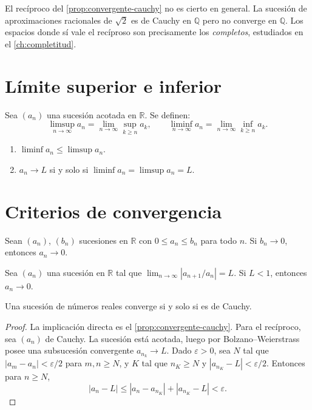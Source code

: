 El recíproco del \cref{prop:convergente-cauchy} no es cierto en general. La sucesión de aproximaciones racionales de $\sqrt{2}$ es de Cauchy en $\mathbb{Q}$ pero no converge en $\mathbb{Q}$. Los espacios donde sí vale el recíproso son precisamente los \emph{completos}, estudiados en el \cref{ch:completitud}.

\section{Límite superior e inferior}

\begin{definition}
\label{def:limsup-liminf}
Sea $(a_n)$ una sucesión acotada en $\mathbb{R}$. Se definen:
\[
  \limsup_{n\to\infty} a_n=\lim_{n\to\infty}\sup_{k\geq n}a_k,\qquad
  \liminf_{n\to\infty} a_n=\lim_{n\to\infty}\inf_{k\geq n}a_k.
\]
\end{definition}

\begin{proposition}
\label{prop:limsup-liminf-carac}
\begin{enumerate}
  \item[(i)] $\liminf a_n\leq\limsup a_n$.
  \item[(ii)] $a_n\to L$ si y solo si $\liminf a_n=\limsup a_n=L$.
\end{enumerate}
\end{proposition}

\section{Criterios de convergencia}

\begin{theorem}
\label{teo:comparacion-sucesiones}
Sean $(a_n)$, $(b_n)$ sucesiones en $\mathbb{R}$ con $0\leq a_n\leq b_n$ para todo $n$. Si $b_n\to 0$, entonces $a_n\to 0$.
\end{theorem}

\begin{theorem}
\label{teo:cociente}
Sea $(a_n)$ una sucesión en $\mathbb{R}$ tal que $\lim_{n\to\infty}|a_{n+1}/a_n|=L$. Si $L<1$, entonces $a_n\to 0$.
\end{theorem}

\begin{theorem}
\label{teo:cauchy-reales}
Una sucesión de números reales converge si y solo si es de Cauchy.
\end{theorem}
\begin{proof}
La implicación directa es el \cref{prop:convergente-cauchy}. Para el recíproco, sea $(a_n)$ de Cauchy. La sucesión está acotada, luego por Bolzano--Weierstrass posee una subsucesión convergente $a_{n_k}\to L$. Dado $\varepsilon>0$, sea $N$ tal que $|a_m-a_n|<\varepsilon/2$ para $m,n\geq N$, y $K$ tal que $n_K\geq N$ y $|a_{n_K}-L|<\varepsilon/2$. Entonces para $n\geq N$,
\[
  |a_n-L|\leq |a_n-a_{n_K}|+|a_{n_K}-L|<\varepsilon.
\]
\end{proof}

